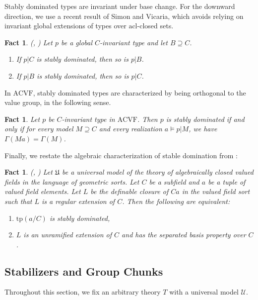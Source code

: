 \documentclass[12pt]{article}
\newcommand{\tpp}{\mathrm{tp}}
\newcommand{\ACVF}{\mathrm{ACVF}}
\newcommand{\acl}{\mathrm{acl}}
\newcommand{\0}{\emptyset}
\newcommand{\U}{\mathcal{U}}
\theoremstyle{plain}%
\newtheorem{fact}[thm]{Fact}
\theoremstyle{definition}
\theoremstyle{remark}
\begin{document}
Stably dominated types are invariant under base change. For the downward direction, we use a recent result of Simon and Vicaria, which avoids relying on invariant global extensions of types over $\acl$-closed sets.
\begin{fact}\label{StabDomExtensions}(\cite[Proposition 4.9]{HHM08}, \cite[Theorem 4.1]{SV24}) Let $p$ be a global $C$-invariant type and let $B\supseteq C$.
\begin{enumerate} 
\item[(i)] If $p|C$ is stably dominated, then so is $p|B$.
\item[(ii)] If $p|B$ is stably dominated, then so is $p|C$.

 
\end{enumerate}
    
\end{fact}

In $\ACVF$, stably dominated types are characterized by being orthogonal to the value group, in the following sense.

\begin{fact}\label{orthogonality_stabdom}
    Let $p$ be $C$-invariant type in $\ACVF$. Then $p$ is stably dominated if and only if for every model $M\supseteq C$ and every realization $a\models p|M$, we have $\Gamma(Ma)=\Gamma(M)$.
\end{fact}

Finally, we restate the algebraic characterization of stable domination from \cite{EHS23}:

\begin{fact}\label{algebraic_stabdom}(\cite[Theorem 3.6]{EHS23}, ) Let $\mathfrak{U}$ be a universal model of the theory of algebraically closed valued fields in the language of geometric sorts. Let $C$ be a subfield and $a$ be a tuple of valued field elements. Let $L$ be the definable closure of $Ca$ in the valued field sort such that $L$ is a regular extension of $C$. Then the following are equivalent:
\begin{enumerate}
    \item $\tpp(a/C)$ is stably dominated,
    \item $L$ is an unramified extension of $C$ and has the separated basis property over $C$.
    \end{enumerate}
    \end{fact}
\subsection{Stabilizers and Group Chunks}
Throughout this section, we fix an arbitrary theory $T$ with a universal model $\U$.
\end{document}
